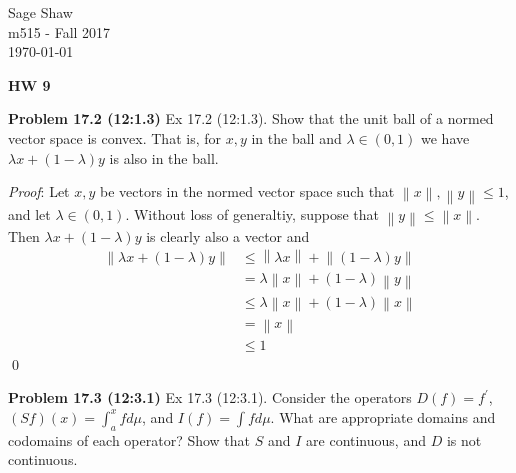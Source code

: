 \documentclass[12pt]{article}
\newcommand{\problem}[1]{\hspace{-4 ex} \large \textbf{Problem #1} }
\newcommand{\norm}[1]{\left\lVert#1\right\rVert}
\renewenvironment{proof}{\hspace{-4 ex} \emph{Proof}:}{\qed}
\begin{document}
	\thispagestyle{empty}
	
	\begin{flushright}
		Sage Shaw \\
		m515 - Fall 2017 \\
		\today
	\end{flushright}
	
{\large \textbf{HW 9}}\bigbreak

\problem{17.2 (12:1.3)}
Ex 17.2 (12:1.3). Show that the unit ball of a normed vector space is convex. That is, for $x,y$ in the ball and $\lambda\in(0,1)$ we have $\lambda x+(1-\lambda)y$ is also in the ball.

	\begin{proof}
		Let $x,y$ be vectors in the normed vector space such that $\norm{x},\norm{y} \leq 1$, and let $\lambda \in (0,1)$. Without loss of generaltiy, suppose that $\norm{y} \leq \norm{x}$. Then $\lambda x + (1 -\lambda)y$ is clearly also a vector and
		\begin{align*}
			\norm{\lambda x + (1 -\lambda)y} & \leq \norm{\lambda x} + \norm{(1 -\lambda)y} \\
			& = \lambda\norm{ x} + (1 -\lambda)\norm{y} \\
			& \leq \lambda\norm{ x} + (1 -\lambda)\norm{x} \\
			& = \norm{x} \\
			& \leq 1
		\end{align*}
	\end{proof}


\problem{17.3 (12:3.1)}
Ex 17.3 (12:3.1). Consider the operators $D(f)=f^\prime$, $(Sf)(x)=\int_a^x fd\mu$, and $I(f)=\int fd\mu$. What are appropriate domains and codomains of each operator? Show that $S$ and $I$ are continuous, and $D$ is not continuous. \bigbreak
\end{document}

